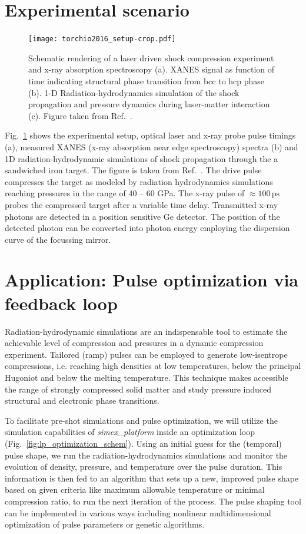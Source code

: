 \documentclass[10pt]{scrartcl}
\begin{document}
\section{Experimental scenario}
\begin{figure}[ht]
  \begin{center}
    \texttt{[image: torchio2016\_setup-crop.pdf]}
  \end{center}
  \caption{Schematic rendering of a laser driven shock compression experiment
  and x-ray absorption spectroscopy (a). XANES signal as function of time
indicating structural phase transition from bcc to hcp phase (b). 1-D
Radiation-hydrodynamics simulation of the shock
propagation and pressure dynamics during laser-matter interaction (c).
Figure taken from Ref.~\cite{Torchio2016}.}
  \label{fig:exp_setup}
\end{figure}
%
Fig.~\ref{fig:exp_setup} shows the experimental setup, optical laser and x-ray
probe pulse timings (a), measured XANES  (x-ray absorption near edge spectroscopy) spectra (b) and 1D radiation-hydrodynamic
simulations of shock propagation through the a sandwiched iron target.
The figure is taken from Ref.~\cite{Torchio2016}. The drive pulse compresses the
target as modeled by radiation hydrodynamics simulations reaching pressures in
the range of 40 -- 60 GPa. The x-ray pulse of $\approx 100\,\text{ps}$ probes
the compressed target after a variable time delay. Transmitted x-ray photons are
detected in a position sensitive Ge detector. The position of the detected
photon can be converted into photon energy employing the dispersion curve of the
focussing mirror.

\section{Application: Pulse optimization via feedback loop}
Radiation-hydrodynamic simulations are an indispensable tool to estimate the
achievable level of compression and pressures in a dynamic compression
experiment. Tailored (ramp) pulses can be employed to generate low-isentrope
compressions, i.e. reaching high densities at low temperatures, below the
principal Hugoniot and below the melting temperature. This technique makes
accessible the range of strongly compressed solid matter and study pressure
induced structural and electronic phase transitions.

To facilitate pre-shot simulations and pulse optimization, we will utilize the
simulation capabilities of \textit{simex\_platform} inside an optimization loop (Fig.~\ref{fig:lp_optimization_schem}).
Using an initial guess for the (temporal) pulse shape, we run the
radiation-hydrodynamics simulations and monitor the evolution of density,
pressure, and temperature over the pulse duration. This information is then fed
to an algorithm that sets up a new, improved pulse shape based on given criteria
like maximum allowable temperature or minimal compression ratio, to run the next
iteration of the process.
The pulse shaping tool can be implemented in various
ways including nonlinear multidimensional optimization of pulse parameters or genetic algorithms.
\end{document}
